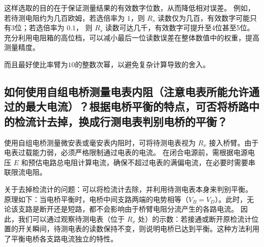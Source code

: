 \documentclass{../../templates/Report}%
\begin{document}
\begin{fullreportonly}
    这样选取的目的在于保证测量结果的有效数字位数，从而降低相对误差。
    例如，若待测电阻约为几百欧姆，若选倍率为 $1$，则 $R_s$ 读数仅为几百，有效数字可能只有3位；若选倍率为 $0.1$，
    则 $R_s$ 读数可达几千，有效数字可提升至4位甚至5位。充分利用电阻箱的高位档，可以减小最后一位读数误差在整体数值中的权重，提高测量精度。

    而且最好使比率臂为$10$的整数次幂，以避免复杂计算导致的舍入。

    \subsection{如何使用自组电桥测量电表内阻（注意电表所能允许通过的最大电流）？根据电桥平衡的特点，可否将桥路中的检流计去掉，换成行测电表判别电桥的平衡？}

    使用自组电桥测量微安表或毫安表内阻时，可将待测电表视为 $R_x$ 接入桥臂。由于电表过载能力弱，必须严格限制通过电表的电流。
    在闭合电源前，需根据电源电压 $E$ 和预估电路总电阻计算电流，确保不超过电表的满偏电流，在必要时需要串联限流电阻。

    关于去掉检流计的问题：可以将检流计去除，并利用待测电表本身来判别平衡。
    原理如下：当电桥平衡时，电桥中间支路两端的电势相等（$V_B = V_D$）。此时，无论该支路是断开还是短路，都不会影响由于桥臂电阻分流产生的各路电流。
    因此，我们可以通过观察待测电表（位于 $R_x$ 处）的示数：若接通或断开原检流计位置的开关瞬间，待测电表的读数保持不变，则说明电桥已达到平衡。这种方法利用了平衡电桥各支路电流独立的特性。
\end{fullreportonly}
\insertnotes
\end{document}
